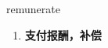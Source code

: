 
\begin{frame}
{\huge remunerate}
\begin{center}
\begin{enumerate}\Large
  \item \textbf{支付报酬，补偿}
\end{enumerate}
\end{center}
\end{frame}
